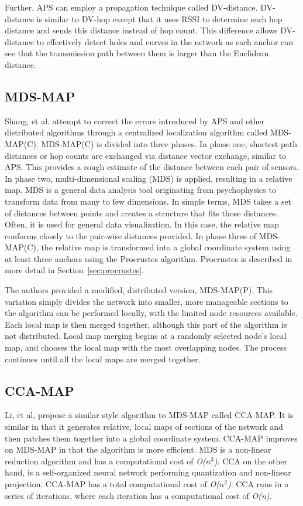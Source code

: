 Further, APS can employ a propagation technique called DV-distance.  DV-distance is similar to DV-hop except that it uses RSSI to determine each hop distance and sends this distance instead of hop count.  This difference allows DV-distance to effectively detect holes and curves in the network as each anchor can see that the transmission path between them is larger than the Euclidean distance.

\subsection{MDS-MAP}
Shang, et al. attempt to correct the errors introduced by APS and other distributed algorithms through a centralized localization algorithm called MDS-MAP(C)\cite{MDS-MAP}.  MDS-MAP(C) is divided into three phases.  In phase one, shortest path distances or hop counts are exchanged via distance vector exchange, similar to APS.  This provides a rough estimate of the distance between each pair of sensors.  In phase two, multi-dimensional scaling (MDS) is applied, resulting in a relative map.  MDS is a general data analysis tool originating from psychophysics to transform data from many to few dimensions.  In simple terms, MDS takes a set of distances between points and creates a structure that fits those distances.  Often, it is used for general data visualization.  In this case, the relative map conforms closely to the pair-wise distances provided.  In phase three of MDS-MAP(C), the relative map is transformed into a global coordinate system using at least three anchors using the Procrustes algorithm.  Procrustes is described in more detail in Section~\ref{sec:procrustes}.

The authors provided a modified, distributed version, MDS-MAP(P)\cite{MDS-MAP-P}.  This variation simply divides the network into smaller, more manageable sections to the algorithm can be performed locally, with the limited node resources available.  Each local map is then merged together, although this part of the algorithm is not distributed.  Local map merging begins at a randomly selected node's local map, and chooses the local map with the most overlapping nodes.  The process continues until all the local maps are merged together.  

\subsection{CCA-MAP} \label{sec:CCA-MAP}
Li, et al, propose a similar style algorithm to MDS-MAP called CCA-MAP\cite{CCA-MAP07,CCA-MAP09}.  It is similar in that it generates relative, local maps of sections of the network and then patches them together into a global coordinate system.  CCA-MAP improves on MDS-MAP in that the algorithm is more efficient.  MDS is a non-linear reduction algorithm and has a computational cost of \emph{O($n^{3}$)}.  CCA\cite{CCA} on the other hand, is a self-organized neural network performing quantization and non-linear projection.  CCA-MAP has a total computational cost of \emph{O($n^{2}$)}.  CCA runs in a series of iterations, where each iteration has a computational cost of \emph{O(n)}.

